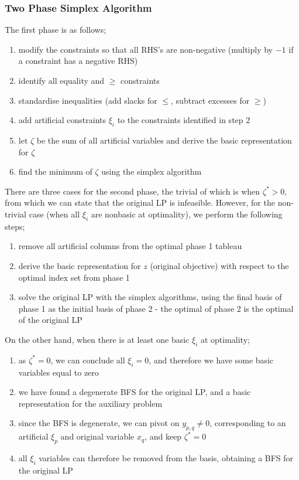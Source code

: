 \documentclass[a4paper, 12pt]{article}
\begin{document}
            \subsubsection*{Two Phase Simplex Algorithm}
                The first phase is as follows;
                \begin{enumerate}[1.]
                    \itemsep0em
                    \item modify the constraints so that all RHS's are non-negative (multiply by $-1$ if a constraint has a negative RHS)
                    \item identify all equality and $\geq$ constraints
                    \item standardise inequalities (add slacks for $\leq$, subtract excesses for $\geq$)
                    \item add artificial constraints $\xi_i$ to the constraints identified in step 2
                    \item let $\zeta$ be the sum of all artificial variables and derive the basic representation for $\zeta$
                    \item find the minimum of $\zeta$ using the simplex algorithm
                \end{enumerate}
                There are three cases for the second phase, the trivial of which is when $\zeta^* > 0$, from which we can state that the original LP is infeasible.
                However, for the non-trivial case (when all $\xi_i$ are nonbasic at optimality), we perform the following steps;
                \begin{enumerate}[1.]
                    \itemsep0em
                    \item remove all artificial columns from the optimal phase 1 tableau
                    \item derive the basic representation for $z$ (original objective) with respect to the optimal index set from phase 1
                    \item solve the original LP with the simplex algorithms, using the final basis of phase 1 as the initial basis of phase 2 - the optimal of phase 2 is the optimal of the original LP
                \end{enumerate}
                On the other hand, when there is at least one basic $\xi_i$ at optimality;
                \begin{enumerate}[1.]
                    \itemsep0em
                    \item as $\zeta^* = 0$, we can conclude all $\xi_i = 0$, and therefore we have some basic variables equal to zero
                    \item we have found a degenerate BFS for the original LP, and a basic representation for the auxiliary problem
                    \item since the BFS is degenerate, we can pivot on $y_{p, q} \neq 0$, corresponding to an artificial $\xi_p$ and original variable $x_q$, and keep $\zeta^* = 0$
                    \item all $\xi_i$ variables can therefore be removed from the basis, obtaining a BFS for the original LP
                \end{enumerate}
\end{document}
